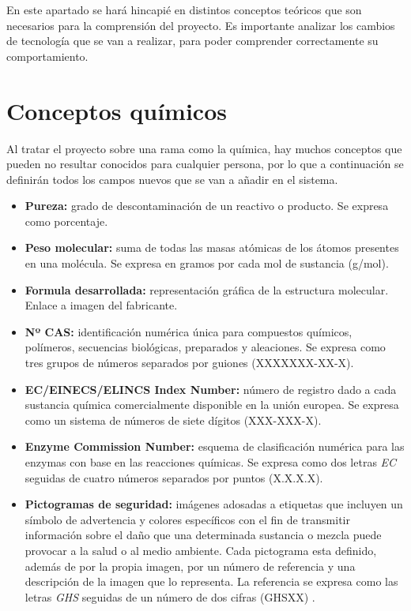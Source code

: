 
En este apartado se hará hincapié en distintos conceptos teóricos que son necesarios para la comprensión del proyecto. Es importante analizar los cambios de tecnología que se van a realizar, para poder comprender correctamente su comportamiento. 

\section{Conceptos químicos}

Al tratar el proyecto sobre una rama como la química, hay muchos conceptos que pueden no resultar conocidos para cualquier persona, por lo que a continuación se definirán todos los campos nuevos que se van a añadir en el sistema.

\begin{itemize}

\item \textbf{Pureza:} grado de descontaminación de un reactivo o producto. Se expresa como porcentaje.

\item \textbf{Peso molecular:} suma de todas las masas atómicas de los átomos presentes en una molécula. Se expresa en gramos por cada mol de sustancia (g/mol).

\item \textbf{Formula desarrollada:} representación gráfica de la estructura molecular. Enlace a imagen del fabricante.

\item \textbf{Nº CAS:} identificación numérica única para compuestos químicos, polímeros, secuencias biológicas, preparados y aleaciones. Se expresa como tres grupos de números separados por guiones (XXXXXXX-XX-X).

\item \textbf{EC/EINECS/ELINCS Index Number:} número de registro dado a cada sustancia química comercialmente disponible en la unión europea. Se expresa como un sistema de números de siete dígitos (XXX-XXX-X).

\item \textbf{Enzyme Commission Number:} esquema de clasificación numérica para las enzymas con base en las reacciones químicas. Se expresa como dos letras \textit{EC} seguidas de cuatro números separados por puntos (X.X.X.X).

\item \textbf{Pictogramas de seguridad:} imágenes adosadas a etiquetas que incluyen un símbolo de advertencia y colores específicos con el fin de transmitir información sobre el daño que una determinada sustancia o mezcla puede provocar a la salud o al medio ambiente. Cada pictograma esta definido, además de por la propia imagen, por un número de referencia y una descripción de la imagen que lo representa. La referencia se expresa como las letras \textit{GHS} seguidas de un número de dos cifras (GHSXX) \cite{Seguridad}.


\end{itemize}
